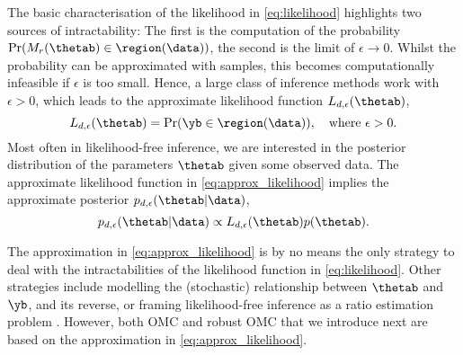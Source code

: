 The basic characterisation of the likelihood in \eqref{eq:likelihood}
highlights two sources of intractability: The first is the computation
of the probability $\Pr(M_r(\thetab) \in \region(\data))$, the second
is the limit of $\epsilon \to 0$.  Whilst the probability can be
approximated with samples, this becomes computationally infeasible if
$\epsilon$ is too small. Hence, a large class of inference methods
work with $\epsilon >0$, which leads to the approximate likelihood
function $L_{d, \epsilon}(\thetab)$,
\begin{equation} \label{eq:approx_likelihood}
  L_{d, \epsilon}(\thetab) = \Pr(\yb \in \region(\data)), \quad \text{where  } \epsilon > 0.
\end{equation}
Most often in likelihood-free inference, we are interested in the posterior distribution of the parameters $\thetab$ given some observed data. The approximate likelihood function in \eqref{eq:approx_likelihood} implies the approximate posterior  $p_{d,\epsilon}(\thetab|\data)$, 
\begin{equation} \label{eq:approx_posterior}
  p_{d,\epsilon}(\thetab|\data) \propto L_{d, \epsilon}(\thetab) p(\thetab).
\end{equation}

The approximation in \eqref{eq:approx_likelihood} is by no means the
only strategy to deal with the intractabilities of the likelihood
function in \eqref{eq:likelihood}. Other strategies include modelling
the (stochastic) relationship between $\thetab$ and $\yb$, and its
reverse, or framing likelihood-free inference as a ratio estimation
problem \citep[see e.g.\ ][]{Blum2010, Wood2010, Papamakarios2016,
Thomas2016, Papamakarios2019, Chen2019, Thomas2020, Hermans2020}. However, both OMC and robust OMC that we introduce next
are based on the approximation in \eqref{eq:approx_likelihood}.





